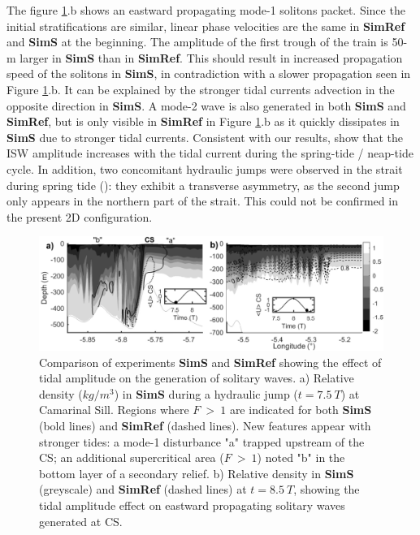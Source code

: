 The figure \ref{fig_cv_spring}.b shows an eastward propagating mode-1 solitons packet. Since the initial stratifications are similar, linear phase velocities are the same in \textbf{SimRef} and \textbf{SimS} at the beginning. The amplitude of the first trough of the train is 50-m larger in \textbf{SimS} than in \textbf{SimRef}. This should result in increased propagation speed of the solitons in \textbf{SimS}, in contradiction with a slower propagation seen in Figure \ref{fig_cv_spring}.b. It can be explained by the stronger tidal currents advection in the opposite direction in \textbf{SimS}. A mode-2 wave is also generated in both \textbf{SimS} and \textbf{SimRef}, but is only visible in \textbf{SimRef} in Figure \ref{fig_cv_spring}.b as it quickly dissipates in \textbf{SimS} due to stronger tidal currents.
Consistent with our results, \citet{FA1988} show that the ISW amplitude increases with the tidal current during the spring-tide / neap-tide cycle. In addition,  two concomitant hydraulic jumps were observed in the strait during spring tide (\citep{SG2011}): they exhibit a transverse asymmetry, as the second jump only appears in the northern part of the strait. This could not be confirmed in the present 2D configuration.

\begin{figure}[!h]
  \centering
  \includegraphics[width=1\textwidth]{./GBR2D/figure10.png}
  \caption[Comparison of experiments \textbf{SimS} and \textbf{SimRef} showing the effect of tidal amplitude on the generation of solitary waves.]{Comparison of experiments \textbf{SimS} and \textbf{SimRef} showing the effect of tidal amplitude on the generation of solitary waves. a) Relative density ($kg/m^3$) in \textbf{SimS} during a hydraulic jump ($t = 7.5\ T$) at Camarinal Sill. Regions where $F\ >\ 1$ are indicated for both \textbf{SimS} (bold lines) and \textbf{SimRef} (dashed lines). New features appear with stronger tides: a mode-1 disturbance "a" trapped upstream of the CS; an additional supercritical area ($F\ >\ 1$) noted "b" in the bottom layer of a secondary relief. b) Relative density in \textbf{SimS} (greyscale) and \textbf{SimRef} (dashed lines) at $t = 8.5\ T$, showing the tidal amplitude effect on eastward propagating solitary waves generated at CS.}
  \label{fig_cv_spring}
\end{figure}


